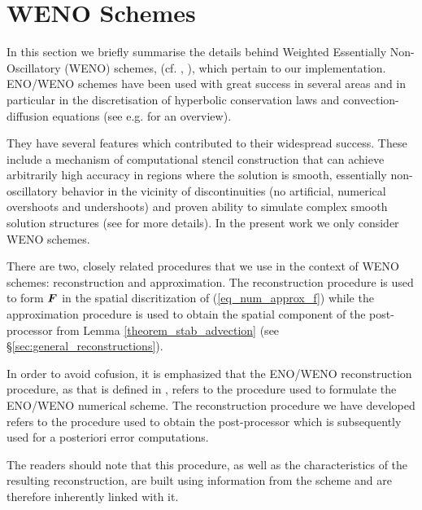 \documentclass[final]{amsart}
\renewcommand{\vec}[1]{\geovec{#1}}
\numberwithin{equation}{section}
\begin{document}
\section{WENO Schemes}\label{sec:ENO_WENO_schemes}

In this section we briefly summarise the details behind Weighted Essentially Non-Oscillatory (WENO) schemes, (cf. \cite{jiang1996efficient}, \cite{shu1998essentially}), which pertain to our implementation.  ENO/WENO schemes have been used with great success in several areas and in particular in the discretisation of hyperbolic conservation laws and convection-diffusion equations (see e.g. \cite{shu2020essentially} for an overview).   

They have several features which contributed to their widespread success.  These include a mechanism of computational stencil construction that can achieve arbitrarily high accuracy in regions where the solution is smooth, essentially non-oscillatory behavior in the vicinity of discontinuities (no artificial, numerical overshoots and undershoots) and proven ability to simulate complex smooth solution structures (see \cite{shu1998essentially} for more details).  In the present work we only consider WENO schemes.

There are two, closely related procedures that we use in the context of WENO schemes: reconstruction and approximation. The reconstruction procedure is used to form $\vec{F}$ in the spatial discritization of (\ref{eq_num_approx_f}) while the approximation procedure is used to obtain the spatial component of the post-processor from Lemma \ref{theorem_stab_advection} (see \S\ref{sec:general_reconstructions}). 


\begin{Rem}
	In order to avoid cofusion, it is emphasized that the ENO/WENO reconstruction procedure, as that is defined in \cite{shu1998essentially}, refers to the procedure  used to formulate the ENO/WENO numerical scheme.
	The reconstruction procedure we have developed refers to the procedure used to obtain the post-processor which is subsequently used for a posteriori error computations.  
	
	The readers should note that this procedure, as well as the characteristics of the resulting reconstruction,  are built using information from the scheme and are therefore inherently linked with it.
\end{Rem}
\end{document}

